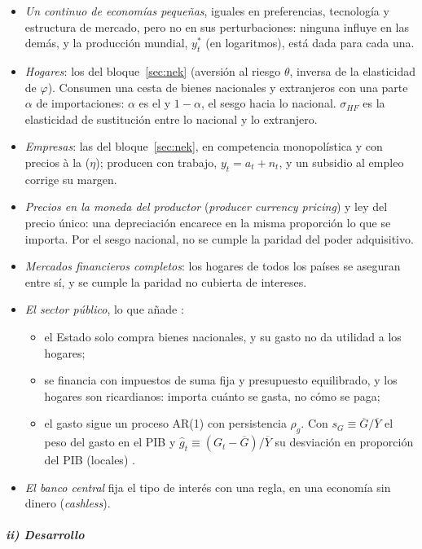 \documentclass[11pt]{article}
\begin{document}
\begin{itemize}
\item \emph{Un continuo de economías pequeñas}, iguales en preferencias, tecnología y estructura de mercado, pero no en sus perturbaciones: ninguna influye en las demás, y la producción mundial, $y^*_t$ (en logaritmos), está dada para cada una.
\item \emph{Hogares}: los del bloque~\ref{sec:nek} (aversión al riesgo $\theta$, inversa de la elasticidad de  $\varphi$). Consumen una cesta de bienes nacionales y extranjeros con una parte $\alpha$ de importaciones: $\alpha$ es el  y $1-\alpha$, el sesgo hacia lo nacional. $\sigma_{HF}$ es la elasticidad de sustitución entre lo nacional y lo extranjero.
\item \emph{Empresas}: las del bloque~\ref{sec:nek}, en competencia monopolística y con precios à la  ($\eta$); producen con trabajo, $y_t=a_t+n_t$, y un subsidio al empleo corrige su margen.
\item \emph{Precios en la moneda del productor} (\emph{producer currency pricing}) y ley del precio único: una depreciación encarece en la misma proporción lo que se importa. Por el sesgo nacional, no se cumple la paridad del poder adquisitivo.
\item \emph{Mercados financieros completos}: los hogares de todos los países se aseguran entre sí, y se cumple la paridad no cubierta de intereses.
\item \emph{El sector público}, lo que añade \textcite{Furlanetto2006Fiscal}:
  \begin{itemize}
  \item el Estado solo compra bienes nacionales, y su gasto no da utilidad a los hogares;
  \item se financia con impuestos de suma fija y presupuesto equilibrado, y los hogares son ricardianos: importa cuánto se gasta, no cómo se paga;
  \item el gasto sigue un proceso AR(1) con persistencia $\rho_g$. Con $s_G\equiv\overline{G}/\overline{Y}$ el peso del gasto en el PIB y $\hat g_t\equiv(G_t-\overline{G})/\overline{Y}$ su desviación en proporción del PIB (locales) .
  \end{itemize}
\item \emph{El banco central} fija el tipo de interés con una regla, en una economía sin dinero (\emph{cashless}).
\end{itemize}

\subparagraph{ii) Desarrollo}
\end{document}
